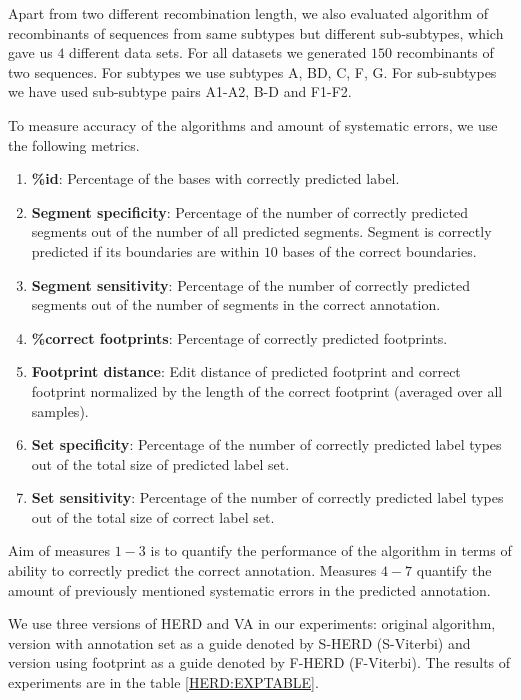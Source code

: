 Apart from two different recombination length, we also evaluated algorithm of
recombinants of sequences from same subtypes but different sub-subtypes, which
gave us $4$ different data sets. For all datasets we generated $150$
recombinants of two sequences. For subtypes we use subtypes A, BD, C, F, G. For
sub-subtypes we have used sub-subtype pairs A1-A2, B-D and F1-F2. 

To measure accuracy of the algorithms and amount of systematic errors, we use
the following metrics.
\begin{enumerate}[itemsep=-1mm]
\item {\bf \%id}: Percentage of the bases with correctly predicted label.

\item {\bf Segment specificity}: Percentage of the number of correctly predicted
segments out of the number of all predicted segments. Segment is correctly
predicted if its boundaries are within $10$ bases of the correct boundaries.

\item {\bf Segment sensitivity}: Percentage of the number of correctly predicted
segments out of the number of segments in the correct annotation.

\item {\bf \%correct footprints}: Percentage of correctly predicted footprints.

\item {\bf Footprint distance}: Edit distance of predicted footprint and
correct footprint normalized by the length of the correct footprint
(averaged over all samples).

\item {\bf Set specificity}: Percentage of the number of correctly predicted label
types out of the total size of predicted label set.

\item {\bf Set sensitivity}: Percentage of the number of correctly predicted label
types out of the total size of correct label set.

\end{enumerate} 
Aim of measures $1-3$ is to quantify the performance of the algorithm in terms
of ability to correctly predict the correct annotation. Measures $4-7$ quantify
the amount of previously mentioned systematic errors in the predicted annotation.

We use three versions of HERD and VA in our experiments: original algorithm,
version with annotation set as a guide denoted by S-HERD (S-Viterbi) and
version using footprint as a guide denoted by F-HERD (F-Viterbi). The results
of experiments are in the table \ref{HERD:EXPTABLE}. 

